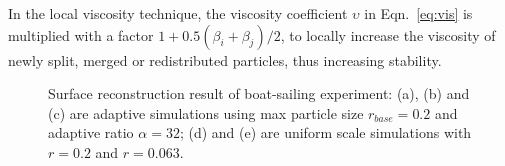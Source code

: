 \documentclass[VANCOUVER,STIX1COL]{WileyNJD-v2}
\begin{document}
In the local viscosity technique, the viscosity coefficient $\upsilon$ in Eqn.~\ref{eq:vis} is multiplied with a factor $1 + 0.5(\beta_i + \beta_j)/2$, to locally increase the viscosity of newly split, merged or redistributed particles, thus increasing stability.

\begin{figure}
    \centering
    \caption{Surface reconstruction result of boat-sailing experiment: (a), (b) and (c) are adaptive simulations using max particle size $r_{base} = 0.2$ and adaptive ratio $\alpha = 32$; (d) and (e) are uniform scale simulations with $r = 0.2$ and $r = 0.063$.}
    \label{fig:ship_reconstruct}
\end{figure}
\end{document}
